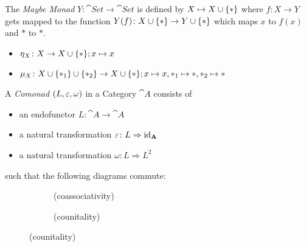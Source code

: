 \begin{example}
    The \textit{Maybe Monad} $Y \colon \cat{Set} \to \cat{Set}$ is defined by
    $X \mapsto X \cup \{\ast\}$ where $f \colon X \to Y$ gets mapped to the function
    $Y(f) \colon X \cup \{\ast\} \to Y \cup \{\ast\}$ which maps $x$ to $f(x)$ and $\ast$ to $\ast$. 
    \begin{itemize}
        \item $\eta_X \colon X \to X \cup \{\ast\}; x \mapsto x$
        \item $\mu_X \colon X \cup \{\ast_1\}  \cup \{\ast_2\} \to X \cup \{\ast\}; x \mapsto x, 
        \ast_1 \mapsto \ast, \ast_2 \mapsto \ast$
    \end{itemize}
\end{example}

\begin{definition}[Comonad]
A \textit{Comonad} $(L,\varepsilon, \omega) $ in a Category $\cat{A}$ consists of
\begin{itemize}
    \item an endofunctor $L\colon \cat{A} \to \cat{A}$
    \item a natural transformation $\varepsilon \colon L \Rightarrow \operatorname{id}_{\mathbf{A}}$ 
    \item a natural transformation $\omega\colon L \Rightarrow L^2 $
\end{itemize}  
such that the following diagrams commute:

\begin{figure}[H]
\centering
\begin{subfigure}{0.4\textwidth}
\centering
\caption*{(coassociativity)}
\end{subfigure}
\hspace{2em}
\begin{subfigure}{0.4\textwidth}
\centering
\caption*{(counitality)}
\end{subfigure}
\end{figure}



\end{definition}
